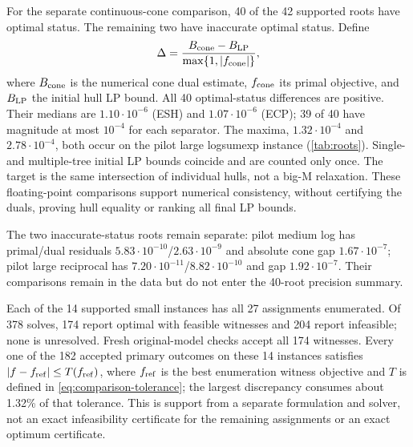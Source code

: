 For the separate continuous-cone comparison, 40 of the 42 supported roots have optimal status. The remaining two have inaccurate optimal status. Define
\[
 \Delta=\frac{B_{\rm cone}-B_{\rm LP}}{\max\{1,|f_{\rm cone}|\}},
\]
where $B_{\rm cone}$ is the numerical cone dual estimate, $f_{\rm cone}$ its primal objective, and $B_{\rm LP}$ the initial hull LP bound. All 40 optimal-status differences are positive. Their medians are $1.10\cdot10^{-6}$ (ESH) and $1.07\cdot10^{-6}$ (ECP); 39 of 40 have magnitude at most $10^{-4}$ for each separator. The maxima, $1.32\cdot10^{-4}$ and $2.78\cdot10^{-4}$, both occur on the pilot large logsumexp instance (\cref{tab:roots}). Single- and multiple-tree initial LP bounds coincide and are counted only once. The target is the same intersection of individual hulls, not a big-M relaxation. These floating-point comparisons support numerical consistency, without certifying the duals, proving hull equality or ranking all final LP bounds.

The two inaccurate-status roots remain separate: pilot medium log has primal/dual residuals $5.83\cdot10^{-10}$/$2.63\cdot10^{-9}$ and absolute cone gap $1.67\cdot10^{-7}$; pilot large reciprocal has $7.20\cdot10^{-11}$/$8.82\cdot10^{-10}$ and gap $1.92\cdot10^{-7}$. Their comparisons remain in the data but do not enter the 40-root precision summary.

Each of the 14 supported small instances has all 27 assignments enumerated. Of 378 solves, 174 report optimal with feasible witnesses and 204 report infeasible; none is unresolved. Fresh original-model checks accept all 174 witnesses. Every one of the 182 accepted primary outcomes on these 14 instances satisfies $|f-f_{\rm ref}|\le T(f_{\rm ref})$, where $f_{\rm ref}$ is the best enumeration witness objective and $T$ is defined in \eqref{eq:comparison-tolerance}; the largest discrepancy consumes about 1.32\% of that tolerance. This is support from a separate formulation and solver, not an exact infeasibility certificate for the remaining assignments or an exact optimum certificate.

